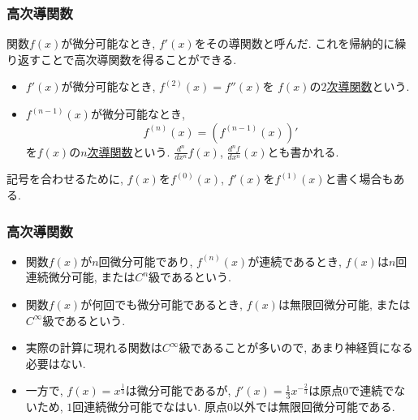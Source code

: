 




\begin{frame}
\frametitle{高次導関数}


関数$f(x)$が微分可能なとき, $f'(x)$をその導関数と呼んだ. 
これを帰納的に繰り返すことで高次導関数を得ることができる. 
\begin{Def}
\begin{itemize}
\item $f'(x)$が微分可能なとき, $f^{(2)}(x)=f''(x)$を $f(x)$の\underline{$2$次導関数}という. 
\item $f^{(n-1)}(x)$が微分可能なとき, 
$$
f^{(n)}(x)=(f^{(n-1)}(x))'
$$
を$f(x)$の\underline{$n$次導関数}という. $\frac{d^n}{dx^n}f(x)$, $\frac{d^nf}{dx^n}(x)$とも書かれる.  
\end{itemize}
\end{Def}

記号を合わせるために, $f(x)$を$f^{(0)}(x)$, $f'(x)$を$f^{(1)}(x)$と書く場合もある.  


\end{frame}







\begin{frame}
\frametitle{高次導関数}


\begin{Def}
\begin{itemize}
\item 関数$f(x)$が$n$回微分可能であり, $f^{(n)}(x)$が連続であるとき, $f(x)$は$n$回連続微分可能, または$C^n$級であるという. 
\item 関数$f(x)$が何回でも微分可能であるとき, $f(x)$は無限回微分可能, または$C^\infty$級であるという. 
\end{itemize}
\end{Def}

\begin{itemize}
\item 実際の計算に現れる関数は$C^\infty$級であることが多いので, あまり神経質になる必要はない. 
\item 一方で, $f(x)=x^{\frac{1}{3}}$は微分可能であるが, $f'(x)=\frac{1}{3}x^{-\frac{2}{3}}$は原点$0$で連続でないため, $1$回連続微分可能でなはい. 
原点$0$以外では無限回微分可能である. 
\end{itemize}

\end{frame}




